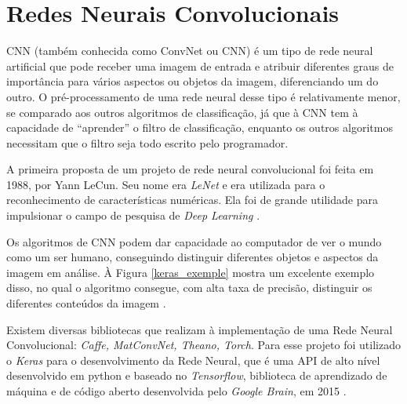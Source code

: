 \section{Redes Neurais Convolucionais}
\label{redes neurais convolucionais}

\acrlong{CNN} (também conhecida como ConvNet ou CNN) é um tipo de rede neural artificial que pode receber uma imagem de entrada e atribuir diferentes graus de importância para vários aspectos ou objetos da imagem, diferenciando um do outro. O pré-processamento de uma rede neural desse tipo é relativamente menor, se comparado aos outros algoritmos de classificação, já que à CNN tem à capacidade de “aprender” o filtro de classificação, enquanto os outros algoritmos necessitam que o filtro seja todo escrito pelo programador\cite{redesneuraisconv,deeplearningbook}.

A primeira proposta de um projeto de rede neural convolucional foi feita em 1988, por Yann LeCun. Seu nome era \textit{LeNet} e era utilizada para o reconhecimento de características numéricas. Ela foi de grande utilidade para impulsionar o campo de pesquisa de \textit{Deep Learning} \cite{redesneuraisconv}.

Os algoritmos de CNN podem dar capacidade ao computador de ver o mundo como um ser humano, conseguindo distinguir diferentes objetos e aspectos da imagem em análise. À Figura  \ref{keras_exemple} mostra um excelente exemplo disso, no qual  o algoritmo consegue, com alta taxa de precisão, distinguir os diferentes conteúdos da imagem \cite{conv1,conv2}.

\begin{figure}[H]
	\centering
\end{figure}

Existem diversas bibliotecas que realizam à implementação de uma Rede Neural Convolucional: \textit{Caffe, MatConvNet, Theano, Torch}. Para esse projeto foi utilizado o \textit{Keras} para o desenvolvimento da Rede Neural, que é uma API de alto nível desenvolvido em python e baseado no \textit{Tensorflow}, biblioteca de aprendizado de máquina  e de código aberto desenvolvida pelo \textit{Google Brain}, em 2015 \cite{redesneuraisconv,keras,tensorflow}.

